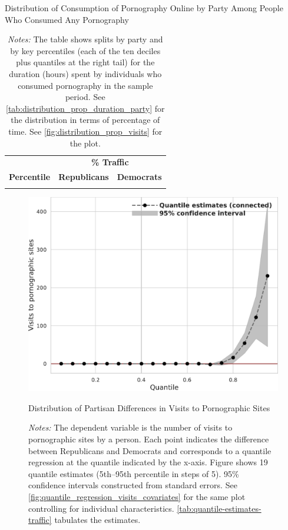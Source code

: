 \documentclass[12pt,twoside]{article}
\begin{document}
\begin{table}[ht] \centering \small \setlength\tabcolsep{10 pt}
	\caption{Distribution of Consumption of Pornography Online by Party Among People Who Consumed Any Pornography}
	\label{tab:distribution_prop_visits_party}
	\begin{adjustbox}{max width=\textwidth}
		\begin{tabular}{crr}
			\toprule
			\multicolumn{1}{l}{\textbf{}}&\multicolumn{2}{c}{\textbf{\% Traffic}}\\
			\cmidrule(l){2-3}
			\multicolumn{1}{l}{\textbf{Percentile}}&\multicolumn{1}{c}{\textbf{Republicans}}&\multicolumn{1}{c}{\textbf{Democrats}}\\
			\midrule
            \\
			\bottomrule
		\end{tabular}
	\end{adjustbox}
	\caption*{\footnotesize \emph{Notes:} 
		The table shows splits by party and by key percentiles (each of the ten deciles plus quantiles at the right tail) for the duration (hours) spent by individuals who consumed pornography in the sample period. 
		See \cref{tab:distribution_prop_duration_party} for the distribution in terms of percentage of time. 
		See \cref{fig:distribution_prop_visits} for the plot.
	}
\end{table}

\FloatBarrier
\begin{figure}
	\centering
	\includegraphics[width=.6\linewidth]{figs/quantile_reg_visits_adult.pdf}
	\caption{Distribution of Partisan Differences in Visits to Pornographic Sites}
	\caption*{\footnotesize \emph{Notes:} 
		The dependent variable is the number of visits to pornographic sites by a person.
		Each point indicates the difference between Republicans and Democrats and corresponds to a quantile regression at the quantile indicated by the x-axis.
  Figure shows 19 quantile estimates (5th--95th percentile in steps of 5).
		95\% confidence intervals constructed from standard errors.
		See \cref{fig:quantile_regression_visits_covariates} for the same plot controlling for individual characteristics.
            \cref{tab:quantile-estimates-traffic} tabulates the estimates.
	}
	\label{fig:quantile_regression_visits}
\end{figure}
\end{document}
